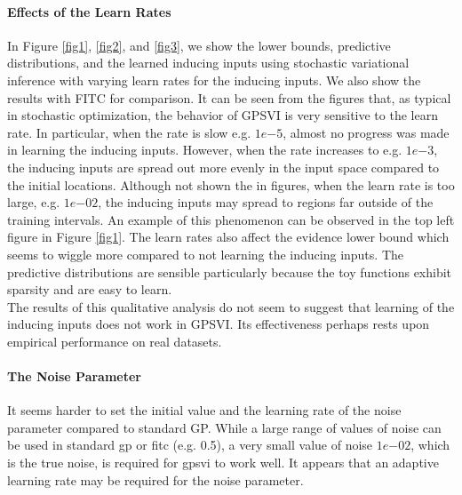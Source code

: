 \documentclass{article} %
\begin{document}
\noindent \paragraph{Effects of the Learn Rates }
In Figure \ref{fig1}, \ref{fig2}, and \ref{fig3}, we show the lower bounds, predictive distributions, and the learned inducing inputs using stochastic variational inference with varying learn rates for the inducing inputs.
We also show the results with FITC for comparison.
It can be seen from the figures that, as typical in stochastic optimization, the behavior of GPSVI is very sensitive to the learn rate.
In particular, when the rate is slow e.g. $1e{-5}$, almost no progress was made in learning the inducing inputs.
However, when the rate increases to e.g. $1e{-3}$, the inducing inputs are spread out more evenly in the input space compared to the initial locations.
Although not shown the in figures, when the learn rate is too large, e.g. $1e{-02}$, the inducing inputs may spread to regions far outside of the training intervals.
An example of this phenomenon can be observed in the top left figure in Figure \ref{fig1}.
The learn rates also affect the evidence lower bound which seems to wiggle more compared to not learning the inducing inputs.
The predictive distributions are sensible particularly because the toy functions exhibit sparsity and are easy to learn.  \\

\noindent The results of this qualitative analysis do not seem to suggest that learning of the inducing inputs does not work in GPSVI.
Its effectiveness perhaps rests upon empirical performance on real datasets.

\noindent \paragraph{The Noise Parameter} It seems harder to set the initial value and the learning rate of the noise parameter compared to standard GP. 
While a large range of values of noise can be used in standard gp or fitc (e.g. 0.5), a very small value of noise $1e{-02}$, which is the true noise, is required for gpsvi to work well.
It appears that an adaptive learning rate may be required for the noise parameter.
\end{document}

